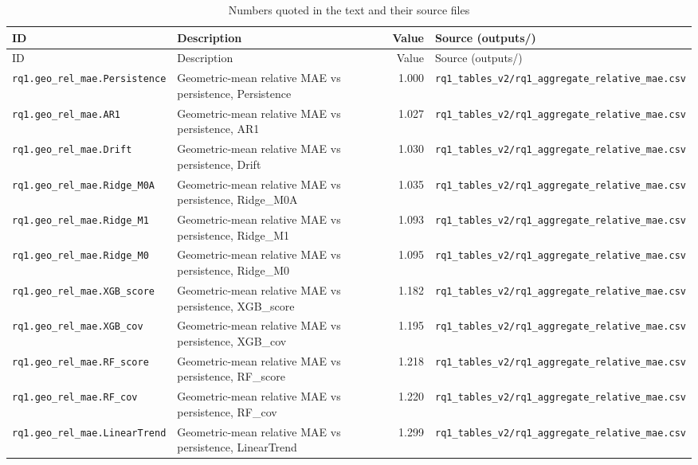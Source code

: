{\scriptsize
\begin{longtable}{p{4.6cm}p{5.6cm}rp{3.6cm}}
\caption{Numbers quoted in the text and their source files}\label{tab:E3}\\
\toprule
ID & Description & Value & Source (outputs/) \\
\midrule
\endfirsthead
\toprule
ID & Description & Value & Source (outputs/) \\
\midrule
\endhead
\bottomrule
\endlastfoot
\texttt{rq1.geo\_rel\_mae.Persistence} & Geometric-mean relative MAE vs persistence, Persistence & 1.000 & \texttt{rq1\_tables\_v2/rq1\_aggregate\_relative\_mae.csv} \\
\texttt{rq1.geo\_rel\_mae.AR1} & Geometric-mean relative MAE vs persistence, AR1 & 1.027 & \texttt{rq1\_tables\_v2/rq1\_aggregate\_relative\_mae.csv} \\
\texttt{rq1.geo\_rel\_mae.Drift} & Geometric-mean relative MAE vs persistence, Drift & 1.030 & \texttt{rq1\_tables\_v2/rq1\_aggregate\_relative\_mae.csv} \\
\texttt{rq1.geo\_rel\_mae.Ridge\_M0A} & Geometric-mean relative MAE vs persistence, Ridge\_M0A & 1.035 & \texttt{rq1\_tables\_v2/rq1\_aggregate\_relative\_mae.csv} \\
\texttt{rq1.geo\_rel\_mae.Ridge\_M1} & Geometric-mean relative MAE vs persistence, Ridge\_M1 & 1.093 & \texttt{rq1\_tables\_v2/rq1\_aggregate\_relative\_mae.csv} \\
\texttt{rq1.geo\_rel\_mae.Ridge\_M0} & Geometric-mean relative MAE vs persistence, Ridge\_M0 & 1.095 & \texttt{rq1\_tables\_v2/rq1\_aggregate\_relative\_mae.csv} \\
\texttt{rq1.geo\_rel\_mae.XGB\_score} & Geometric-mean relative MAE vs persistence, XGB\_score & 1.182 & \texttt{rq1\_tables\_v2/rq1\_aggregate\_relative\_mae.csv} \\
\texttt{rq1.geo\_rel\_mae.XGB\_cov} & Geometric-mean relative MAE vs persistence, XGB\_cov & 1.195 & \texttt{rq1\_tables\_v2/rq1\_aggregate\_relative\_mae.csv} \\
\texttt{rq1.geo\_rel\_mae.RF\_score} & Geometric-mean relative MAE vs persistence, RF\_score & 1.218 & \texttt{rq1\_tables\_v2/rq1\_aggregate\_relative\_mae.csv} \\
\texttt{rq1.geo\_rel\_mae.RF\_cov} & Geometric-mean relative MAE vs persistence, RF\_cov & 1.220 & \texttt{rq1\_tables\_v2/rq1\_aggregate\_relative\_mae.csv} \\
\texttt{rq1.geo\_rel\_mae.LinearTrend} & Geometric-mean relative MAE vs persistence, LinearTrend & 1.299 & \texttt{rq1\_tables\_v2/rq1\_aggregate\_relative\_mae.csv} \\

\end{longtable}}
